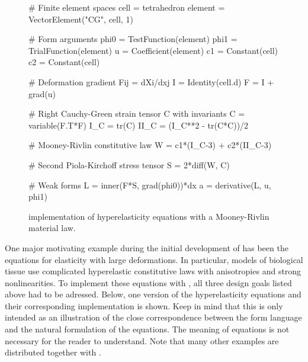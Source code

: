 \begin{figure}\label{ufl:fig:hypcode}
\begin{python}
# Finite element spaces
cell = tetrahedron
element = VectorElement("CG", cell, 1)

# Form arguments
phi0 = TestFunction(element)
phi1 = TrialFunction(element)
u = Coefficient(element)
c1 = Constant(cell)
c2 = Constant(cell)

# Deformation gradient Fij = dXi/dxj
I = Identity(cell.d)
F = I + grad(u)

# Right Cauchy-Green strain tensor C with invariants
C = variable(F.T*F)
I_C = tr(C)
II_C = (I_C**2 - tr(C*C))/2

# Mooney-Rivlin constitutive law
W = c1*(I_C-3) + c2*(II_C-3)

# Second Piola-Kirchoff stress tensor
S = 2*diff(W, C)

# Weak forms
L = inner(F*S, grad(phi0))*dx
a = derivative(L, u, phi1)
\end{python}
\caption{\ufl{} implementation of hyperelasticity equations with a Mooney-Rivlin material law.}
\end{figure}

One major motivating example during the initial development of \ufl{}
has been the equations for elasticity with large deformations.  In
particular, models of biological tissue use complicated hyperelastic
constitutive laws with anisotropies and strong nonlinearities.  To
implement these equations with \fenics{}, all three design goals
listed above had to be adressed.  Below, one version of the
hyperelasticity equations and their corresponding \ufl{}
implementation is shown.  Keep in mind that this is only intended as
an illustration of the close correspondence between the form language
and the natural formulation of the equations.  The meaning of
equations is not necessary for the reader to understand.  Note that
many other examples are distributed together with \ufl{}.

